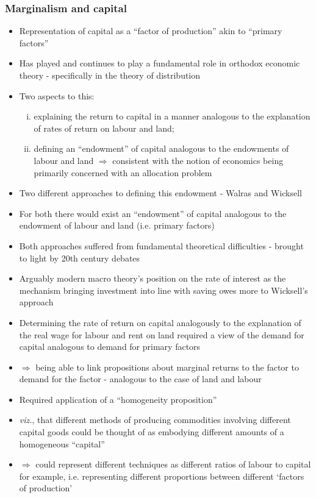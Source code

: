 \documentclass{article}
\begin{document}
	\subsubsection{Marginalism and capital}
	\begin{itemize}
		\item Representation of capital as a ``factor of production'' akin to ``primary factors''
		\item Has played and continues to play a fundamental role in orthodox economic theory - specifically in the theory of distribution
		\item Two aspects to this:
		\begin{enumerate}[(i)]
			\item explaining the return to capital in a manner analogous to the explanation of rates of return on labour and land;
			\item defining an ``endowment'' of capital analogous to the endowments of labour and land \( \Rightarrow \) consistent with the notion of economics being primarily concerned with an allocation problem
		\end{enumerate}
		\item Two different approaches to defining this endowment - Walras and Wicksell
		\item For both there would exist an ``endowment'' of capital analogous to the endowment of labour and land (i.e. primary factors)
		\item Both approaches suffered from fundamental theoretical difficulties - brought to light by 20th century debates
		\item Arguably modern macro theory's position on the rate of interest as the mechanism bringing investment into line with saving owes more to Wicksell's approach
		\item Determining the rate of return on capital analogously to the explanation of the real wage for labour and rent on land required a view of the demand for capital analogous to demand for primary factors
		\item \( \Rightarrow \) being able to link propositions about marginal returns to the factor to demand for the factor - analogous to the case of land and labour 
		\item Required application of a ``homogeneity proposition''
		\item  \textit{viz.}, that different methods of producing commodities involving different capital goods could be thought of as embodying different amounts of a homogeneous ``capital''
		\item \( \Rightarrow \) could represent different techniques as different ratios of labour to capital for example, i.e. representing different proportions between different `factors of production' 

\end{itemize}
\end{document}
